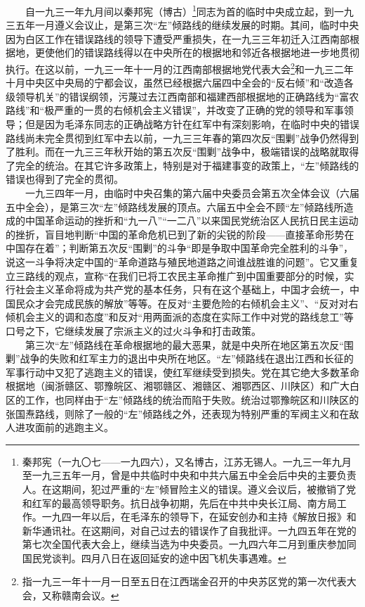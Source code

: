 \documentclass[cn,11pt,chinese]{elegantbook}
\begin{document}
　　自一九三一年九月间以秦邦宪（博古）\footnote[10]{ 秦邦宪（一九〇七——一九四六），又名博古，江苏无锡人。一九三一年九月至一九三五年一月，曾是中共临时中央和中共六届五中全会后中央的主要负责人。在这期间，犯过严重的“左”倾冒险主义的错误。遵义会议后，被撤销了党和红军的最高领导职务。抗日战争初期，先后在中共中央长江局、南方局工作。一九四一年以后，在毛泽东的领导下，在延安创办和主持《解放日报》和新华通讯社。在这期间，对自己过去的错误作了自我批评。一九四五年在党的第七次全国代表大会上，继续当选为中央委员。一九四六年二月到重庆参加同国民党谈判。四月八日在返回延安的途中因飞机失事遇难。}同志为首的临时中央成立起，到一九三五年一月遵义会议止，是第三次“左”倾路线的继续发展的时期。其间，临时中央因为白区工作在错误路线的领导下遭受严重损失，在一九三三年初迁入江西南部根据地，更使他们的错误路线得以在中央所在的根据地和邻近各根据地进一步地贯彻执行。在这以前，一九三一年十一月的江西南部根据地党代表大会\footnote[11]{ 指一九三一年十一月一日至五日在江西瑞金召开的中央苏区党的第一次代表大会，又称赣南会议。}和一九三二年十月中央区中央局的宁都会议，虽然已经根据六届四中全会的“反右倾”和“改造各级领导机关”的错误纲领，污蔑过去江西南部和福建西部根据地的正确路线为“富农路线”和“极严重的一贯的右倾机会主义错误”，并改变了正确的党的领导和军事领导；但是因为毛泽东同志的正确战略方针在红军中有深刻影响，在临时中央的错误路线尚未完全贯彻到红军中去以前，一九三三年春的第四次反“围剿”战争仍然得到了胜利。而在一九三三年秋开始的第五次反“围剿”战争中，极端错误的战略就取得了完全的统治。在其它许多政策上，特别是对于福建事变的政策上，“左”倾路线的错误也得到了完全的贯彻。\\
　　一九三四年一月，由临时中央召集的第六届中央委员会第五次全体会议（六届五中全会），是第三次“左”倾路线发展的顶点。六届五中全会不顾“左”倾路线所造成的中国革命运动的挫折和“九一八”“一二八”以来国民党统治区人民抗日民主运动的挫折，盲目地判断“中国的革命危机已到了新的尖锐的阶段——直接革命形势在中国存在着”；判断第五次反“围剿”的斗争“即是争取中国革命完全胜利的斗争”，说这一斗争将决定中国的“革命道路与殖民地道路之间谁战胜谁的问题”。它又重复立三路线的观点，宣称“在我们已将工农民主革命推广到中国重要部分的时候，实行社会主义革命将成为共产党的基本任务，只有在这个基础上，中国才会统一，中国民众才会完成民族的解放”等等。在反对“主要危险的右倾机会主义”、“反对对右倾机会主义的调和态度”和反对“用两面派的态度在实际工作中对党的路线怠工”等口号之下，它继续发展了宗派主义的过火斗争和打击政策。\\
　　第三次“左”倾路线在革命根据地的最大恶果，就是中央所在地区第五次反“围剿”战争的失败和红军主力的退出中央所在地区。“左”倾路线在退出江西和长征的军事行动中又犯了逃跑主义的错误，使红军继续受到损失。党在其它绝大多数革命根据地（闽浙赣区、鄂豫皖区、湘鄂赣区、湘赣区、湘鄂西区、川陕区）和广大白区的工作，也同样由于“左”倾路线的统治而陷于失败。统治过鄂豫皖区和川陕区的张国焘路线，则除了一般的“左”倾路线之外，还表现为特别严重的军阀主义和在敌人进攻面前的逃跑主义。\\
\end{document}
